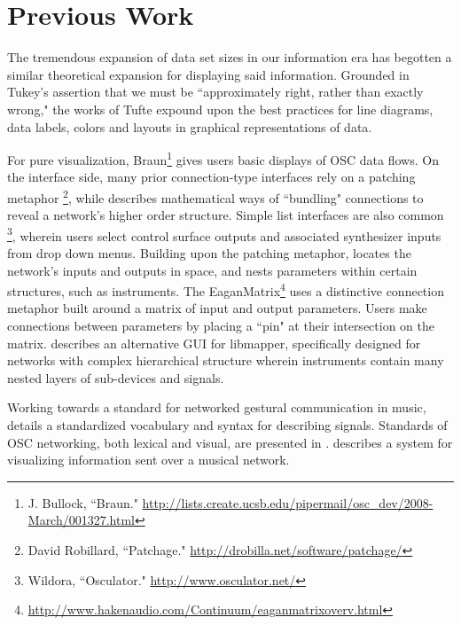 \documentclass[11pt]{article}
\begin{document}
\section*{Previous Work}

  The tremendous expansion of data set sizes in our information era \cite{tufte1} has begotten a similar theoretical expansion for displaying said information. Grounded in Tukey's \cite{tuckey} assertion that we must be ``approximately right, rather than exactly wrong," the works of Tufte \cite{tufte1, tufte2} expound upon the best practices for line diagrams, data labels, colors and layouts in graphical representations of data. 
  
  For pure visualization, Braun\footnote{J. Bullock, ``Braun." \url{http://lists.create.ucsb.edu/pipermail/osc_dev/2008-March/001327.html}} gives users basic displays of OSC data flows. 
  On the interface side, many prior connection-type interfaces rely on a patching metaphor \cite{integra}\footnote{David Robillard, ``Patchage." \url{http://drobilla.net/software/patchage/}}, while \cite{HEB} describes mathematical ways of ``bundling" connections to reveal a network's higher order structure. Simple list interfaces are also common \cite{junxion}\footnote{Wildora, ``Osculator." \url{http://www.osculator.net/}}, wherein users select control surface outputs and associated synthesizer inputs from drop down menus. Building upon the patching metaphor, \cite{inclusiveInterconnections} locates the network's inputs and outputs in space, and nests parameters within certain structures, such as instruments. The EaganMatrix\footnote{\url{http://www.hakenaudio.com/Continuum/eaganmatrixoverv.html}} uses a distinctive connection metaphor built around a matrix of input and output parameters. Users make connections between parameters by placing a ``pin" at their intersection on the matrix. \cite{vizmapper} describes an alternative GUI for libmapper, specifically designed for networks with complex hierarchical structure wherein instruments contain many nested layers of sub-devices and signals.
  
  Working towards a standard for networked gestural communication in music, \cite{GDIF} details a standardized vocabulary and syntax for describing signals. Standards of OSC networking, both lexical and visual, are presented in \cite{jamoma, senseStage}.  \cite{MPGcarepackage} describes a system for visualizing information sent over a musical network. 
  
\end{document}
